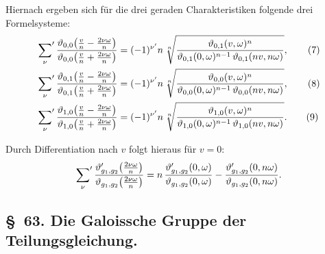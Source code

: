 \documentclass[11pt,a4paper]{article}
\theoremstyle{plain}
\theoremstyle{remark}
\begin{document}
Hiernach ergeben sich für die drei geraden Charakteristiken
folgende drei Formelsysteme:
\begin{align}
\sideset{}{'}\sum_{\nu}
\frac{\vartheta_{0,0}\bigl(\frac{v}{n}-\frac{2\nu\omega}{n}\bigr)}
     {\vartheta_{0,0}\bigl(\frac{v}{n}+\frac{2\nu\omega}{n}\bigr)}
&= (-1)^{\nu'}n\,\sqrt[n]{\frac{\vartheta_{0,1}(v,\omega)^n}
                               {\vartheta_{0,1}(0,\omega)^{n-1}\,
                                \vartheta_{0,1}(nv,n\omega)}},
\tag{7}\\
\sideset{}{'}\sum_{\nu}
\frac{\vartheta_{0,1}\bigl(\frac{v}{n}-\frac{2\nu\omega}{n}\bigr)}
     {\vartheta_{0,1}\bigl(\frac{v}{n}+\frac{2\nu\omega}{n}\bigr)}
&= (-1)^{\nu'}n\,\sqrt[n]{\frac{\vartheta_{0,0}(v,\omega)^n}
                               {\vartheta_{0,0}(0,\omega)^{n-1}\,
                                \vartheta_{0,0}(nv,n\omega)}},
\tag{8}\\
\sideset{}{'}\sum_{\nu}
\frac{\vartheta_{1,0}\bigl(\frac{v}{n}-\frac{2\nu\omega}{n}\bigr)}
     {\vartheta_{1,0}\bigl(\frac{v}{n}+\frac{2\nu\omega}{n}\bigr)}
&= (-1)^{\nu'}n\,\sqrt[n]{\frac{\vartheta_{1,0}(v,\omega)^n}
                               {\vartheta_{1,0}(0,\omega)^{n-1}\,
                                \vartheta_{1,0}(nv,n\omega)}}.
\tag{9}
\end{align}

Durch Differentiation nach $v$ folgt hieraus für $v=0$:
\begin{equation}\label{eq:62:10}
\sideset{}{'}\sum_{\nu}
\frac{\vartheta'_{g_1,g_2}\bigl(\frac{2\nu\omega}{n}\bigr)}
     {\vartheta_{g_1,g_2}\bigl(\frac{2\nu\omega}{n}\bigr)}
= n\,\frac{\vartheta'_{g_1,g_2}(0,\omega)}
           {\vartheta_{g_1,g_2}(0,\omega)}
- \frac{\vartheta'_{g_1,g_2}(0,n\omega)}
       {\vartheta_{g_1,g_2}(0,n\omega)}.
\end{equation}


\subsection*{§~63. Die Galoissche Gruppe der Teilungsgleichung.}
\end{document}
